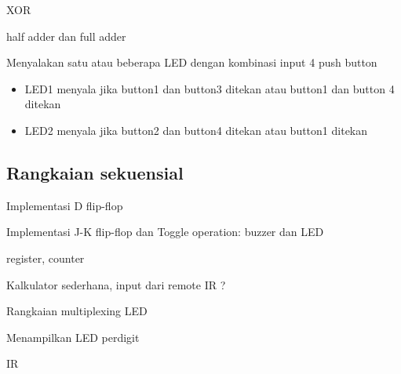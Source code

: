 XOR

half adder dan full adder

Menyalakan satu atau beberapa LED dengan kombinasi input
4 push button
\begin{itemize}
\item LED1 menyala jika button1 dan button3 ditekan atau button1 dan button 4 ditekan
\item LED2 menyala jika button2 dan button4 ditekan atau button1 ditekan
\end{itemize}





\subsection{Rangkaian sekuensial}

Implementasi D flip-flop

Implementasi J-K flip-flop dan
Toggle operation: buzzer dan LED

register, counter

Kalkulator sederhana, input dari remote IR ?

Rangkaian multiplexing LED

Menampilkan LED perdigit

IR
